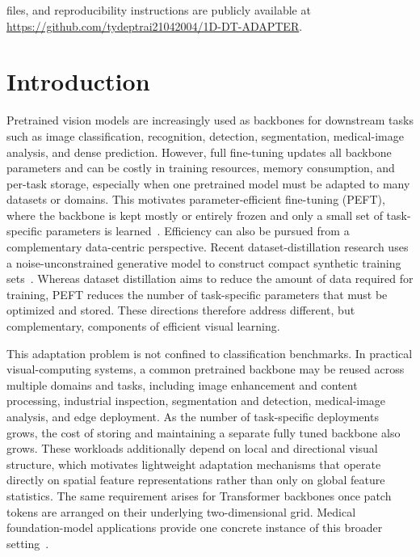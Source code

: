 \documentclass[pdflatex,sn-mathphys-num]{sn-jnl}
\theoremstyle{thmstyleone}
\theoremstyle{thmstyletwo}
\theoremstyle{thmstylethree}
\begin{document}
{files, and reproducibility instructions are publicly available at \url{https://github.com/tydeptrai21042004/1D-DT-ADAPTER}.
}




\maketitle


\section{Introduction}
\label{sec:Introduction}

Pretrained vision models are increasingly used as backbones for downstream tasks such as image classification, recognition, detection, segmentation, medical-image analysis, and dense prediction. 
However, full fine-tuning updates all backbone parameters and can be costly in training resources, memory consumption, and per-task storage, especially when one pretrained model must be adapted to many datasets or domains. 
This motivates parameter-efficient fine-tuning (PEFT), where the backbone is kept mostly or entirely frozen and only a small set of task-specific parameters is learned~\cite{houlsby2019adapter,hu2022lora,jia2022vpt,lian2022ssf}. 
Efficiency can also be pursued from a complementary data-centric perspective. Recent dataset-distillation research uses a noise-unconstrained generative model to construct compact synthetic training sets~\cite{zhang2026datasetdistillation}. Whereas dataset distillation aims to reduce the amount of data required for training, PEFT reduces the number of task-specific parameters that must be optimized and stored. These directions therefore address different, but complementary, components of efficient visual learning.

This adaptation problem is not confined to classification benchmarks. In practical visual-computing systems, a common pretrained backbone may be reused across multiple domains and tasks, including image enhancement and content processing, industrial inspection, segmentation and detection, medical-image analysis, and edge deployment. As the number of task-specific deployments grows, the cost of storing and maintaining a separate fully tuned backbone also grows. These workloads additionally depend on local and directional visual structure, which motivates lightweight adaptation mechanisms that operate directly on spatial feature representations rather than only on global feature statistics. The same requirement arises for Transformer backbones once patch tokens are arranged on their underlying two-dimensional grid. Medical foundation-model applications provide one concrete instance of this broader setting~\cite{wu2025eyefm,meng2025deepdkd}.
\end{document}
